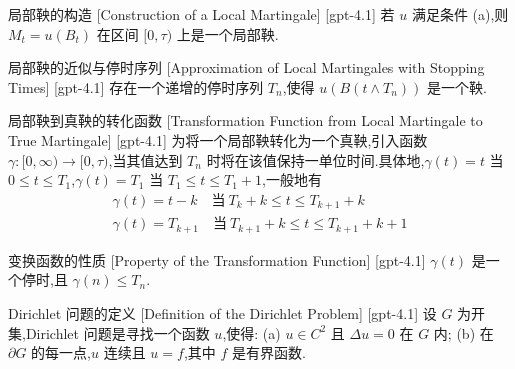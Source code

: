 \documentclass[UTF8]{ctexart}
\begin{document}
    \begin{thm}
        {局部鞅的构造}
        [Construction of a Local Martingale]
        [gpt-4.1]
        若 $u$ 满足条件 (a),则 $M_{t} = u(B_{t})$ 在区间 $[0, \tau)$ 上是一个局部鞅.
    \end{thm}
    
    
    
    \begin{dfn}
        {局部鞅的近似与停时序列}
        [Approximation of Local Martingales with Stopping Times]
        [gpt-4.1]
        存在一个递增的停时序列 $T_{n}$,使得 $u(B(t \land T_{n}))$ 是一个鞅.
    \end{dfn}
    
    
    
    \begin{dfn}
        {局部鞅到真鞅的转化函数}
        [Transformation Function from Local Martingale to True Martingale]
        [gpt-4.1]
        为将一个局部鞅转化为一个真鞅,引入函数 $\gamma : [0, \infty) \to [0, \tau)$,当其值达到 $T_{n}$ 时将在该值保持一单位时间.具体地,$\gamma(t) = t$ 当 $0 \leq t \leq T_{1}$,$\gamma(t) = T_{1}$ 当 $T_{1} \leq t \leq T_{1} + 1$,一般地有
\[
\begin{array}{l}
\gamma(t) = t - k \quad \mathrm{当~} T_{k} + k \leq t \leq T_{k+1} + k \\
\gamma(t) = T_{k+1} \quad \mathrm{当~} T_{k+1} + k \leq t \leq T_{k+1} + k + 1
\end{array}
\]
    \end{dfn}
    
    
    
    \begin{ppt}
        {变换函数的性质}
        [Property of the Transformation Function]
        [gpt-4.1]
        $\gamma(t)$ 是一个停时,且 $\gamma(n) \leq T_{n}$.
    \end{ppt}
    
    
    
    \begin{dfn}
        {Dirichlet 问题的定义}
        [Definition of the Dirichlet Problem]
        [gpt-4.1]
        设 $G$ 为开集,Dirichlet 问题是寻找一个函数 $u$,使得:
(a) $u \in C^{2}$ 且 $\Delta u = 0$ 在 $G$ 内;
(b) 在 $\partial G$ 的每一点,$u$ 连续且 $u = f$,其中 $f$ 是有界函数.

    \end{dfn}
    
\end{document}
